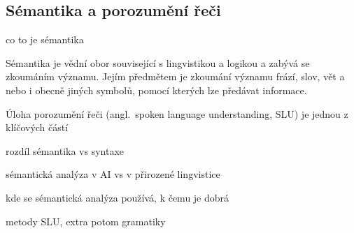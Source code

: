 \subsection{Sémantika a porozumění řeči}
{\color{blue}co to je sémantika}

Sémantika je vědní obor související s lingvistikou a logikou a zabývá se zkoumáním významu.
Jejím předmětem je zkoumání významu frází, slov, vět a nebo i obecně jiných symbolů, pomocí kterých lze předávat informace.

Úloha porozumění řeči (angl.~spoken language understanding, SLU) je jednou z klíčových částí


{\color{blue}rozdíl sémantika vs syntaxe}

{\color{blue}sémantická analýza v AI vs v přirozené lingvistice}

{\color{blue}kde se sémantická analýza používá, k čemu je dobrá}

{\color{blue}metody SLU, extra potom gramatiky}

